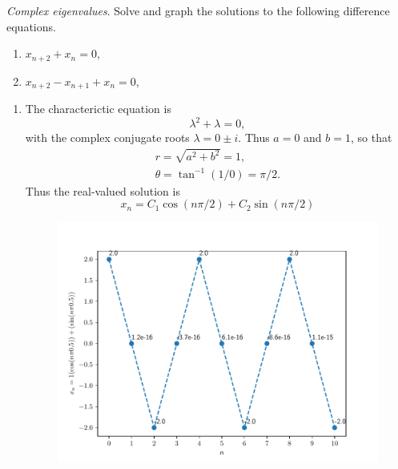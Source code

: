 \begin{homeworkProblem}
    \textit{Complex eigenvalues}. Solve and graph the  solutions to the following
    difference equations.
    \begin{enumerate}
        \item $x_{n+2} + x_n = 0$,
        \item $x_{n+2} - x_{n+1} + x_n = 0$,
    \end{enumerate}

    \segline

    \solution

    \begin{enumerate}
        \item The characterictic equation is \[
            \lambda^2 + \lambda = 0,
        \]
        with the complex conjugate roots $\lambda = 0 \pm i$. Thus $a=0$ and $b=1$,
        so that \[
            \begin{aligned}
                r = \sqrt{a^2 + b^2} = 1,\\
                \theta = \tan^{-1}(1/0) = \pi/2.
            \end{aligned}
        \]
        Thus the real-valued solution is \[
            x_n = C_1 \cos (n\pi/2) + C_2 \sin (n\pi/2)
        \]
        \begin{figure}[H]
            \centering
            \includegraphics[scale=0.5]{fig/fig9(a).pdf}
        \end{figure}


\end{enumerate}
\end{homeworkProblem}
